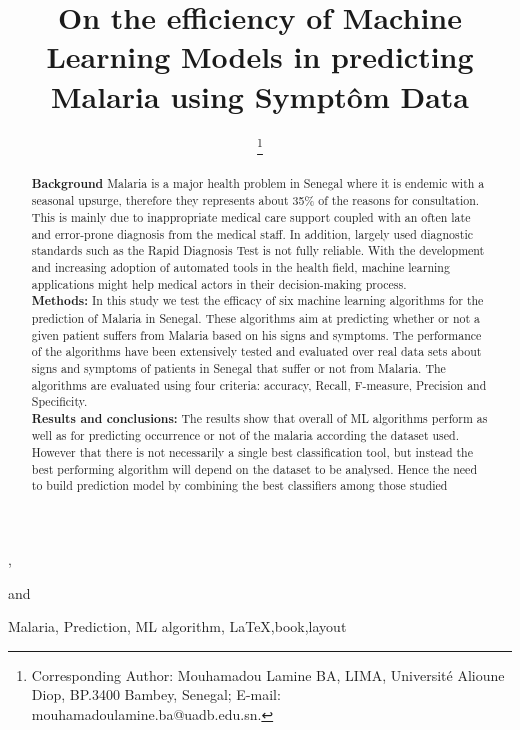 \documentclass{IOS-Book-Article}
\def\hb{\hbox to 10.7 cm{}}
\def\hb{\hbox to 10.7 cm{}}
\begin{document}
\pagestyle{headings}
\def\thepage{}
\begin{frontmatter}              %

\title{On the efficiency of Machine Learning Models in predicting Malaria using Sympt\^om Data}

\markboth{}{January 2020\hb}

\author{ },
\author{ 
\thanks{Corresponding Author: Mouhamadou Lamine BA, LIMA, Universit\'e Alioune Diop,
BP.3400 Bambey, Senegal; E-mail: mouhamadoulamine.ba@uadb.edu.sn.}}
and
\author{ }

\address{LIMA, Universit\'e Alioune Diop, Bambey, Senegal}

\begin{abstract}
\textbf{Background}
Malaria is a major health problem in Senegal where it is endemic with a seasonal upsurge, therefore they represents about 35\% of the reasons for consultation. This is mainly due to inappropriate medical care support coupled with an often late and error-prone diagnosis from the medical staff. In addition, largely used diagnostic standards such as the Rapid Diagnosis Test is not fully reliable. With the development and increasing adoption of automated tools in the health field, machine learning applications might help medical actors in their decision-making process. \\
\textbf{Methods:} In this study we test the efficacy of six machine learning algorithms for the prediction of Malaria in Senegal. These algorithms aim at predicting whether or not a given patient suffers from Malaria based on his signs and symptoms. The performance of the algorithms have been extensively tested and evaluated over real data sets about signs and symptoms of patients in Senegal that suffer or not from Malaria. The algorithms are evaluated using four criteria: accuracy, Recall, F-measure, Precision and Specificity. \\
\textbf{Results and conclusions:} The results show that overall of ML algorithms perform as well as for predicting occurrence or not of the malaria according the dataset used. However  that there is not necessarily a single best classification tool, but instead the best performing algorithm will depend on the dataset to be analysed. Hence the need to build prediction model by combining the best classifiers among those studied

\end{abstract}

\begin{keyword}
Malaria, Prediction, ML algorithm, 
\LaTeX\sep book\sep layout
\end{keyword}
\end{frontmatter}
\markboth{January 2020\hb}{January 2020\hb}


\newpage







\end{document}
